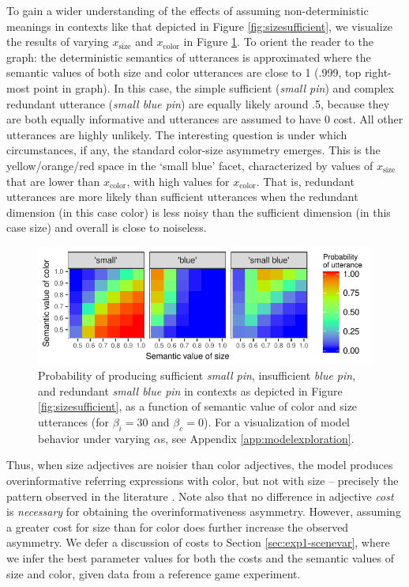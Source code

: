 \documentclass[11pt]{article}
\newcommand{\figref}[1]{Figure \ref{#1}}
\newcommand{\appref}[1]{Appendix \ref{#1}}
\newcommand{\sectionref}[1]{Section \ref{#1}}
\begin{document}
To gain a wider understanding of the effects of assuming non-deterministic meanings in contexts like that depicted in \figref{fig:sizesufficient}, we visualize the results of varying  $x_{\text{size}}$ and $x_{\text{color}}$ in \figref{fig:basicasymmetry}. To orient the reader to the graph: the deterministic semantics of utterances is approximated where the  semantic values of both size and color utterances are close to 1 (.999, top right-most point in graph).  In this case, the simple sufficient (\emph{small pin}) and complex redundant utterance (\emph{small blue pin}) are equally likely around .5, because they are both equally informative and utterances are assumed to have 0 cost. All other utterances are highly unlikely. The interesting question is under which circumstances, if any,  the standard color-size asymmetry emerges. This is the yellow/orange/red space in the `small blue' facet, characterized by values of $x_{\text{size}}$ that are lower than $x_{\text{color}}$, with high values for $x_{\text{color}}$. That is, redundant utterances are more likely than sufficient utterances when the redundant dimension (in this case color) is less noisy than the sufficient dimension (in this case size) and overall is close to noiseless. 

\begin{figure}
\centering
\includegraphics[width=.9\textwidth]{pics/modelexploration-fidelityeffect-paper}

\caption{Probability of producing sufficient \emph{small pin}, insufficient \emph{blue pin}, and redundant \emph{small blue pin} in contexts as depicted in \figref{fig:sizesufficient}, as a function of semantic value of color and size utterances (for $\beta_i = 30$ and $ \beta_c = 0$). For a visualization of model behavior under varying $\alpha$s, see \appref{app:modelexploration}.}
\label{fig:basicasymmetry}
\end{figure}

Thus, when size adjectives are noisier than color adjectives, the model produces overinformative referring expressions with color, but not with size -- precisely the pattern observed in the literature \cite{Pechmann1989, gatt2011}. Note also that no difference in adjective \emph{cost} is \emph{necessary} for obtaining the overinformativeness asymmetry. However, assuming a greater cost for size than for color does further increase the observed asymmetry. We defer a discussion of costs to \sectionref{sec:exp1-scenevar}, where we infer the best parameter values for both the costs and the semantic values of size and color, given data from a reference game experiment.
\end{document}
